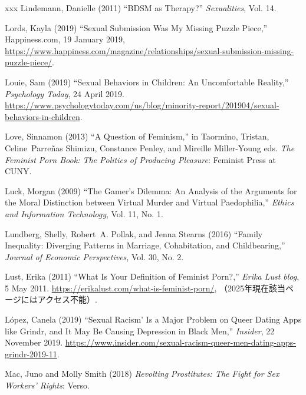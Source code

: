 \documentclass[]{jlreq} \usepackage{mystyle}
\begin{document}
\begin{thebibliography}{xxx}
Lindemann, Danielle (2011) ``BDSM as Therapy?'' \textit{ Sexualities}, Vol. 14.

Lords, Kayla (2019) ``Sexual Submission Was My Missing Puzzle Piece,''
  Happiness.com, 19 January 2019,
  \url{https://www.happiness.com/magazine/relationships/sexual-submission-missing-puzzle-piece/}.

Louie, Sam (2019) ``Sexual Behaviors in Children: An Uncomfortable Reality,''
  \emph{Psychology Today}, 24 April 2019.
  \url{https://www.psychologytoday.com/us/blog/minority-report/201904/sexual-behaviors-in-children}.

Love, Sinnamon (2013) ``A Question of Feminism,'' in Taormino, Tristan,
  Celine~Parreñas Shimizu, Constance Penley, and Mireille Miller-Young eds.
  \textit{ The Feminist Porn Book: The Politics of Producing Pleasure}:
  Feminist Press at CUNY.

Luck, Morgan (2009) ``The Gamer's Dilemma: An Analysis of the Arguments for the
  Moral Distinction between Virtual Murder and Virtual Paedophilia,'' \textit{
  Ethics and Information Technology}, Vol. 11, No. 1.

Lundberg, Shelly, Robert~A. Pollak, and Jenna Stearns (2016) ``Family
  Inequality: Diverging Patterns in Marriage, Cohabitation, and Childbearing,''
  \textit{ Journal of Economic Perspectives}, Vol. 30, No. 2.

Lust, Erika (2011) ``What Is Your Definition of Feminist Porn?,'' \emph{Erika
  Lust blog}, 5 May 2011. \url{https://erikalust.com/what-is-feminist-porn/},
  （2025年現在該当ページにはアクセス不能）.

López, Canela (2019) ``Sexual Racism' Is a Major Problem on Queer Dating Apps
  like Grindr, and It May Be Causing Depression in Black Men,'' \emph{Insider},
  22 November 2019.
  \url{https://www.insider.com/sexual-racism-queer-men-dating-apps-grindr-2019-11}.

Mac, Juno and Molly Smith (2018)  \textit{ Revolting Prostitutes: The Fight for
  Sex Workers' Rights}: Verso.


\end{thebibliography}
\end{document}
